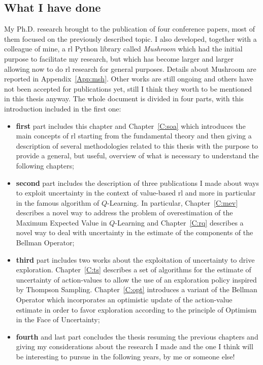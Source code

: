 \subsection{What I have done}
My Ph.D. research brought to the publication of four conference papers, most of them focused on the previously described topic. I also developed, together with a colleague of mine, a \gls{rl} Python library called \textit{Mushroom} which had the initial purpose to facilitate my research, but which has become larger and larger allowing now to do \gls{rl} research for general purposes. Details about Mushroom are reported in Appendix~\ref{App:msh}. Other works are still ongoing and others have not been accepted for publications yet, still I think they worth to be mentioned in this thesis anyway. The whole document is divided in four parts, with this introduction included in the first one:
\begin{itemize}
 \item \textbf{first} part includes this chapter and Chapter~\ref{C:soa} which introduces the main concepts of \gls{rl} starting from the fundamental theory and then giving a description of several methodologies related to this thesis with the purpose to provide a general, but useful, overview of what is necessary to understand the following chapters;
 \item \textbf{second} part includes the description of three publications I made about ways to exploit uncertainty in the context of value-based \gls{rl} and more in particular in the famous algorithm of $Q$-Learning. In particular, Chapter~\ref{C:mev} describes a novel way to address the problem of overestimation of the Maximum Expected Value in $Q$-Learning and Chapter~\ref{C:rq} describes a novel way to deal with uncertainty in the estimate of the components of the Bellman Operator;
 \item \textbf{third} part includes two works about the exploitation of uncertainty to drive exploration. Chapter~\ref{C:ts} describes a set of algorithms for the estimate of uncertainty of action-values to allow the use of an exploration policy inspired by Thompson Sampling. Chapter~\ref{C:opt} introduces a variant of the Bellman Operator which incorporates an optimistic update of the action-value estimate in order to favor exploration according to the principle of Optimism in the Face of Uncertainty;
 \item \textbf{fourth} and last part concludes the thesis resuming the previous chapters and giving my considerations about the research I made and the one I think will be interesting to pursue in the following years, by me or someone else!
\end{itemize}
